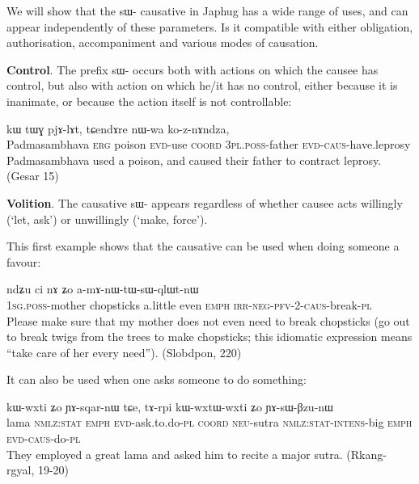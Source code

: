 \documentclass[oldfontcommands,oneside,a4paper,11pt]{memoir}
\newcommand{\ipa}[1]{{\phon #1}} %
\newcommand{\caus}{\textsc{caus}}
\newcommand{\coord}{\textsc{coord}}
\newcommand{\erg}{\textsc{erg}}
\newcommand{\emphat}{\textsc{emph}}
\newcommand{\evd}{\textsc{evd}}
\newcommand{\intens}{\textsc{intens}}
\newcommand{\irr}{\textsc{irr}}
\newcommand{\negat}{\textsc{neg}}
\newcommand{\neu}{\textsc{neu}}
\newcommand{\nmlz}{\textsc{nmlz}}
\newcommand{\pfv}{\textsc{pfv}}
\newcommand{\pl}{\textsc{pl}}
\newcommand{\poss}{\textsc{poss}}
\newcommand{\sg}{\textsc{sg}}
\newcommand{\stat}{\textsc{stat}}
\begin{document}
 
 We will show that the \ipa{sɯ-} causative in Japhug has a wide range of uses, and can appear independently of these parameters. Is it compatible with either obligation, authorisation, accompaniment and various modes of causation. 
 
   \textbf{Control}. The prefix \ipa{sɯ-} occurs both with actions on which the causee has control, but also with action on which he/it has no control, either because it is inanimate, or because the action itself is not controllable:
 \begin{exe}
\ex 
\gll  \ipa{ɯrɟɤnpanma} 	\ipa{kɯ} 	\ipa{tɯɣ} 	\ipa{pjɤ-lɤt,} 	\ipa{tɕendɤre} 	\ipa{nɯ-wa} 	\ipa{ko-z-nɤndza,}  \\
Padmasambhava \erg{} poison \evd{}-use \coord{} 3\pl{}.\poss{}-father \evd{}-\caus{}-have.leprosy \\
 \glt Padmasambhava used a poison, and caused their father to contract leprosy.    (Gesar 15)
\end{exe}

 \textbf{Volition}. The causative \ipa{sɯ-} appears regardless of whether causee acts willingly (`let, ask') or unwillingly (`make, force').
 
 This first example shows that the causative can be used when doing someone a favour:
  \begin{exe}
\ex 
\gll   \ipa{a-mu} 	\ipa{ndʑu} 	\ipa{ci} \ipa{nɤ}	\ipa{ʑo} 	\ipa{a-mɤ-nɯ-tɯ-sɯ-qlɯt-nɯ} \\
  1\sg{}.\poss{}-mother chopsticks a.little even \emphat{} \irr{}-\negat{}-\pfv{}-2-\caus{}-break-\pl{} \\
 \glt    Please make sure that my mother does not even need to break chopsticks (go out to break twigs from the trees to make chopsticks; this idiomatic expression means ``take care of her every need''). (Slobdpon, 220)
\end{exe}

 It can also be used when one asks someone to do something:
 \begin{exe}
\ex 
\gll  \ipa{βlama} 	\ipa{kɯ-wxti} 	\ipa{ʑo} 	\ipa{ɲɤ-sqar-nɯ} 	\ipa{tɕe,} 	\ipa{tɤ-rpi} 	\ipa{kɯ-wxtɯ-wxti} 	\ipa{ʑo} 	\ipa{ɲɤ-sɯ-βzu-nɯ}  \\
lama \nmlz{}:\stat{} \emphat{} \evd{}-ask.to.do-\pl{} \coord{} \neu{}-sutra \nmlz{}:\stat{}-\intens{}-big \emphat{} \evd{}-\caus{}-do-\pl{} \\
 \glt   They employed a great lama and asked him to recite a major sutra. (Rkang-rgyal, 19-20)
\end{exe}
\end{document}
